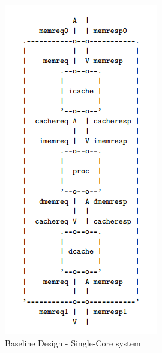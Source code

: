 \documentclass[10pt]{article}
\begin{document}
\begin{figure}[H]
	\centering
	\includegraphics{bline_diag}
	\caption{Baseline Design - Single-Core system}
	\label{fig:bline}
\end{figure}
\end{document}
